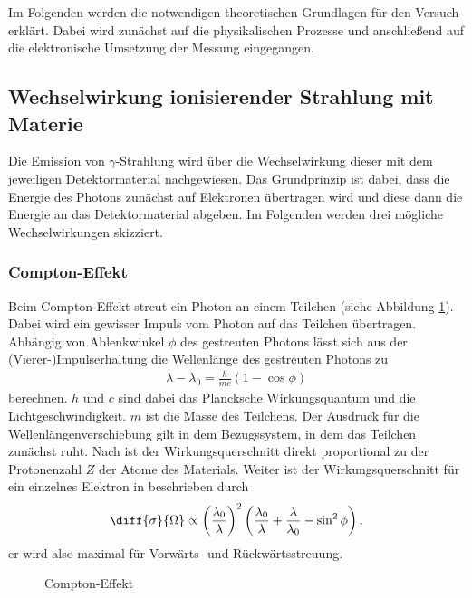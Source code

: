 Im Folgenden werden die notwendigen theoretischen Grundlagen für den Versuch erklärt. Dabei wird zunächst auf die physikalischen Prozesse und anschließend auf die elektronische Umsetzung der Messung eingegangen. 
\subsection{Wechselwirkung ionisierender Strahlung mit Materie}
Die Emission von $\gamma$-Strahlung wird über die Wechselwirkung dieser mit dem jeweiligen Detektormaterial nachgewiesen. Das Grundprinzip ist dabei, dass die Energie des Photons zunächst auf Elektronen übertragen wird und diese dann die Energie an das Detektormaterial abgeben. Im Folgenden werden drei mögliche Wechselwirkungen skizziert.
\subsubsection*{Compton-Effekt} 
Beim Compton-Effekt streut ein Photon an einem Teilchen (siehe Abbildung \ref{fig:compton}). Dabei wird ein gewisser Impuls vom Photon auf das Teilchen übertragen. Abhängig von Ablenkwinkel $\phi$ des gestreuten Photons lässt sich aus der (Vierer-)Impulserhaltung die Wellenlänge des gestreuten Photons zu
\begin{align}
  \lambda-\lambda_0=\frac{h}{mc}(1-\cos \phi)
  \label{eq:compton}
\end{align} 
berechnen. $h$ und $c$ sind dabei das Plancksche Wirkungsquantum und die Lichtgeschwindigkeit. $m$ ist die Masse des Teilchens. Der Ausdruck für die Wellenlängenverschiebung gilt in dem Bezugssystem, in dem das Teilchen zunächst ruht. Nach \cite{wirkungsquerschnitt} ist der Wirkungsquerschnitt direkt proportional zu der Protonenzahl $Z$ der Atome des Materials. Weiter ist der Wirkungsquerschnitt für ein einzelnes Elektron in \cite{wirkungsquerschnitt} beschrieben durch 
\begin{align}
  \diff{\sigma}{\Omega} \propto \left( \frac{\lambda_0}{\lambda} \right)^2 \left( \frac{\lambda_0}{\lambda}+ \frac{\lambda}{\lambda_0}-\sin^2 \phi\right),
\label{eq:compton_cs}
\end{align} 
er wird also maximal für Vorwärts- und Rückwärtsstreuung.
\begin{figure}[h]
  \centering
  \caption{Compton-Effekt}
  \label{fig:compton}
\end{figure}

